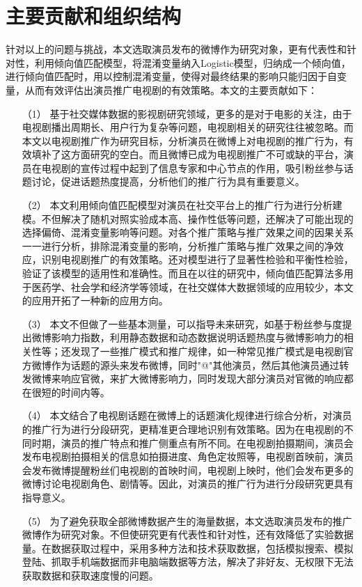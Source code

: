 \section{主要贡献和组织结构}

针对以上的问题与挑战，本文选取演员发布的微博作为研究对象，更有代表性和针对性，利用倾向值匹配模型，将混淆变量纳入Logistic模型，归纳成一个倾向值，进行倾向值匹配时，用以控制混淆变量，使得对最终结果的影响只能归因于自变量，从而有效评估出演员推广电视剧的有效策略。本文的主要贡献如下：

\begin{itemize}

\item[（1）]基于社交媒体数据的影视剧研究领域，更多的是对于电影的关注，由于电视剧播出周期长、用户行为复杂等问题，电视剧相关的研究往往被忽略。而本文以电视剧推广作为研究目标，分析演员在微博上对电视剧的推广行为，有效填补了这方面研究的空白。而且微博已成为电视剧推广不可或缺的平台，演员在电视剧的宣传过程中起到了信息专家和中心节点的作用，吸引粉丝参与话题讨论，促进话题热度提高，分析他们的推广行为具有重要意义。

\item[（2）]本文利用倾向值匹配模型对演员在社交平台上的推广行为进行分析建模。不但解决了随机对照实验成本高、操作性低等问题，还解决了可能出现的选择偏倚、混淆变量影响等问题。对各个推广策略与推广效果之间的因果关系一一进行分析，排除混淆变量的影响，分析推广策略与推广效果之间的净效应，识别电视剧推广的有效策略。还对模型进行了显著性检验和平衡性检验，验证了该模型的适用性和准确性。而且在以往的研究中，倾向值匹配算法多用于医药学、社会学和经济学等领域，在社交媒体大数据领域的应用较少，本文的应用开拓了一种新的应用方向。

\item[（3）]本文不但做了一些基本测量，可以指导未来研究，如基于粉丝参与度提出微博影响力指数，利用静态数据和动态数据说明话题热度与微博影响力的相关性等；还发现了一些推广模式和推广规律，如一种常见推广模式是电视剧官方微博作为话题的源头来发布微博，同时"@"其他演员，然后其他演员通过转发微博来响应官微，来扩大微博影响力，同时发现大部分演员对官微的响应都在很短的时间内等。

\item[（4）]本文结合了电视剧话题在微博上的话题演化规律进行综合分析，对演员的推广行为进行分段研究，更精准更合理地识别有效策略。因为在电视剧的不同时期，演员的推广特点和推广侧重点有所不同。在电视剧拍摄期间，演员会发布电视剧拍摄相关的信息如拍摄进度、角色定妆照等，电视剧首映前，演员会发布微博提醒粉丝们电视剧的首映时间，电视剧上映时，他们会发布更多的微博讨论电视剧角色、剧情等。因此，对演员的推广行为进行分段研究更具有指导意义。

\item[（5）]为了避免获取全部微博数据产生的海量数据，本文选取演员发布的推广微博作为研究对象。不但使研究更有代表性和针对性，还有效降低了实验数据量。在数据获取过程中，采用多种方法和技术获取数据，包括模拟搜索、模拟登陆、抓取手机端数据而非电脑端数据等方法，解决了非好友、无权限下无法获取数据和获取速度慢的问题。

\end{itemize}

